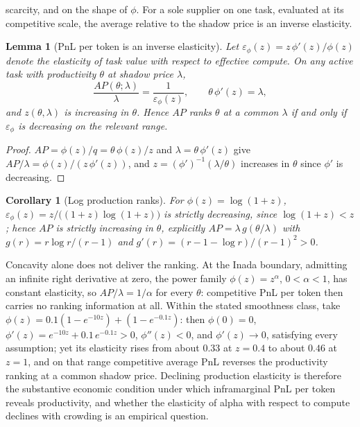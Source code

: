 \documentclass[11pt]{article}
\newtheorem{lemma}{Lemma}
\newtheorem{corollary}{Corollary}
\theoremstyle{definition}
\theoremstyle{remark}
\begin{document}
scarcity, and on the shape of $\phi$. For a sole supplier on one task, evaluated at its competitive scale, the average relative to the shadow price is an inverse elasticity.

\begin{lemma}[PnL per token is an inverse elasticity]
\label{lem:ap}
Let $\varepsilon_\phi(z) = z\,\phi'(z)/\phi(z)$ denote the elasticity of task value with respect to effective compute. On any active task with productivity $\theta$ at shadow price $\lambda$,
\begin{equation}
\frac{AP(\theta;\lambda)}{\lambda} = \frac{1}{\varepsilon_\phi(z)},
\qquad
\theta\,\phi'(z) = \lambda,
\end{equation}
and $z(\theta,\lambda)$ is increasing in $\theta$. Hence $AP$ ranks $\theta$ at a common $\lambda$ if and only if $\varepsilon_\phi$ is decreasing on the relevant range.
\end{lemma}

\begin{proof}
$AP = \phi(z)/q = \theta\,\phi(z)/z$ and $\lambda = \theta\,\phi'(z)$ give $AP/\lambda = \phi(z)/(z\,\phi'(z))$, and $z = (\phi')^{-1}(\lambda/\theta)$ increases in $\theta$ since $\phi'$ is decreasing.
\end{proof}

\begin{corollary}[Log production ranks]
\label{cor:log}
For $\phi(z) = \log(1+z)$, $\varepsilon_\phi(z) = z/\big((1+z)\log(1+z)\big)$ is strictly decreasing, since $\log(1+z) < z$; hence $AP$ is strictly increasing in $\theta$, explicitly $AP = \lambda\, g(\theta/\lambda)$ with $g(r) = r\log r/(r-1)$ and $g'(r) = (r - 1 - \log r)/(r-1)^2 > 0$.
\end{corollary}

Concavity alone does not deliver the ranking. At the Inada boundary, admitting an infinite right derivative at zero, the power family $\phi(z) = z^\alpha$, $0 < \alpha < 1$, has constant elasticity, so $AP/\lambda = 1/\alpha$ for every $\theta$: competitive PnL per token then carries no ranking information at all. Within the stated smoothness class, take $\phi(z) = 0.1(1 - e^{-10z}) + (1 - e^{-0.1z})$: then $\phi(0) = 0$, $\phi'(z) = e^{-10z} + 0.1\,e^{-0.1z} > 0$, $\phi''(z) < 0$, and $\phi'(z) \to 0$, satisfying every assumption; yet its elasticity rises from about $0.33$ at $z = 0.4$ to about $0.46$ at $z = 1$, and on that range competitive average PnL reverses the productivity ranking at a common shadow price. Declining production elasticity is therefore the substantive economic condition under which inframarginal PnL per token reveals productivity, and whether the elasticity of alpha with respect to compute declines with crowding is an empirical question.
\end{document}
